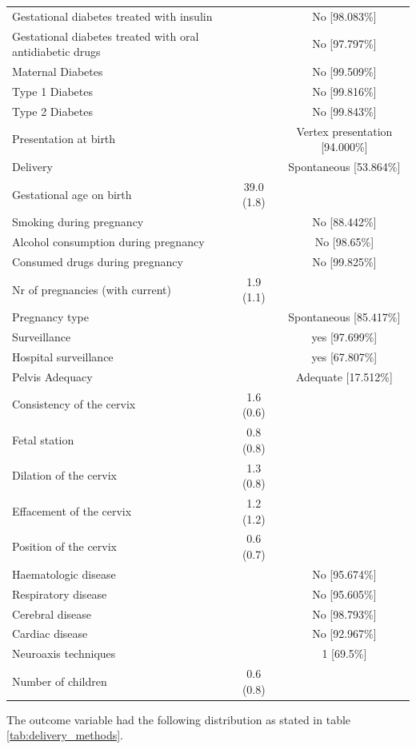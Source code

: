 \begin{table}[htbp]
\begin{tabular}{m{15em}cc}
        Gestational diabetes treated with insulin & ~ & No [98.083\%] \\ 
        Gestational diabetes treated with oral antidiabetic drugs & ~ & No [97.797\%] \\ 
        Maternal Diabetes & ~ & No [99.509\%] \\ 
        Type 1 Diabetes & ~ & No [99.816\%] \\ 
        Type 2 Diabetes & ~ & No [99.843\%] \\ 
        Presentation at birth & ~ & Vertex presentation [94.000\%] \\ 
        Delivery & ~ & Spontaneous [53.864\%] \\ 
        Gestational age on birth & 39.0 (1.8) & ~ \\ 
        Smoking during pregnancy & ~ & No [88.442\%] \\ 
        Alcohol consumption during pregnancy & ~ & No [98.65\%] \\ 
        Consumed drugs during pregnancy & ~ & No [99.825\%] \\ 
        Nr of pregnancies (with current) & 1.9 (1.1) & ~ \\ 
        Pregnancy type & ~ & Spontaneous [85.417\%] \\ 
        Surveillance & ~ & yes [97.699\%] \\ 
        Hospital surveillance & ~ & yes [67.807\%] \\ 
        Pelvis Adequacy & ~ & Adequate [17.512\%] \\ 
        Consistency of the cervix & 1.6 (0.6) & ~ \\ 
        Fetal station & 0.8 (0.8) & ~ \\ 
        Dilation of the cervix & 1.3 (0.8) & ~ \\ 
        Effacement of the cervix & 1.2 (1.2) & ~ \\ 
        Position of the cervix & 0.6 (0.7) & ~ \\ 
        Haematologic disease & ~ & No [95.674\%] \\ 
        Respiratory disease & ~ & No [95.605\%] \\ 
        Cerebral disease & ~ & No [98.793\%] \\ 
        Cardiac disease & ~ & No [92.967\%] \\ 
        Neuroaxis techniques & ~ & 1 [69.5\%] \\ 
        Number of children  & 0.6 (0.8)  & ~\\ 
        \bottomrule
    \end{tabular}


\end{table}
The outcome variable had the following distribution as stated in table \ref{tab:delivery_methods}.


